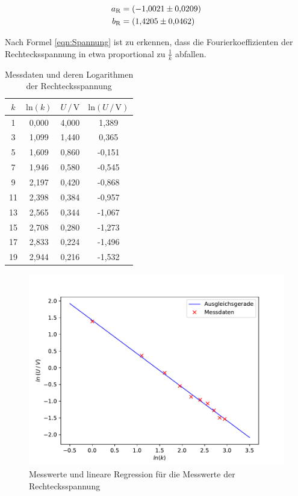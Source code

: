 \begin{align*}
    a_\text{R} &= \SI{-1.0021 \pm 0.0209}{} \\
    b_\text{R} &= \SI{1.4205 \pm 0.0462}{}
\end{align*}

Nach Formel \eqref{eqn:Spannung} ist zu erkennen, dass die Fourierkoeffizienten der Rechtecksspannung in etwa
proportional zu $\frac{1}{k}$ abfallen.

\begin{table}
    \centering
    \caption{Messdaten und deren Logarithmen der Rechtecksspannung}
    \label{tab:Messdaten2}
    \begin{tabular}{c c c c}
    \toprule
    $k$ & $\text{ln} (k)$ & $U \,/\, \si{\volt}$ & $\text{ln}(U \,/\, \si{\volt})$ \\
    \midrule
    1 & 0,000 & 4,000 &  1,389 \\
    3 & 1,099 & 1,440 &  0,365 \\
    5 & 1,609 & 0,860 & -0,151 \\
    7 & 1,946 & 0,580 & -0,545 \\
    9 & 2,197 & 0,420 & -0,868 \\
   11 & 2,398 & 0,384 & -0,957 \\
   13 & 2,565 & 0,344 & -1,067 \\
   15 & 2,708 & 0,280 & -1,273 \\
   17 & 2,833 & 0,224 & -1,496 \\
   19 & 2,944 & 0,216 & -1,532 \\
    \bottomrule
    \end{tabular}
\end{table} 

\begin{figure}
    \centering
    \includegraphics[scale=1.0]{content/plot2.pdf}
    \caption{Messwerte und lineare Regression für die Messwerte der Rechtecksspannung}
    \label{fig:Recht}
\end{figure}

